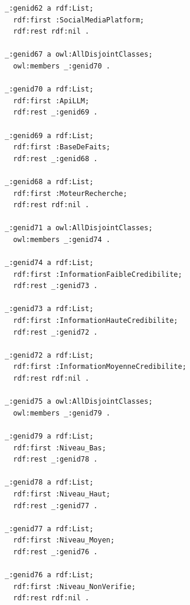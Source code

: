 \documentclass[9pt,twocolumn,twoside,french]{article}
\begin{document}
\begin{lstlisting}[language=Turtle,basicstyle=\ttfamily\tiny,frame=single]
_:genid62 a rdf:List;
  rdf:first :SocialMediaPlatform;
  rdf:rest rdf:nil .

_:genid67 a owl:AllDisjointClasses;
  owl:members _:genid70 .

_:genid70 a rdf:List;
  rdf:first :ApiLLM;
  rdf:rest _:genid69 .

_:genid69 a rdf:List;
  rdf:first :BaseDeFaits;
  rdf:rest _:genid68 .

_:genid68 a rdf:List;
  rdf:first :MoteurRecherche;
  rdf:rest rdf:nil .

_:genid71 a owl:AllDisjointClasses;
  owl:members _:genid74 .

_:genid74 a rdf:List;
  rdf:first :InformationFaibleCredibilite;
  rdf:rest _:genid73 .

_:genid73 a rdf:List;
  rdf:first :InformationHauteCredibilite;
  rdf:rest _:genid72 .

_:genid72 a rdf:List;
  rdf:first :InformationMoyenneCredibilite;
  rdf:rest rdf:nil .

_:genid75 a owl:AllDisjointClasses;
  owl:members _:genid79 .

_:genid79 a rdf:List;
  rdf:first :Niveau_Bas;
  rdf:rest _:genid78 .

_:genid78 a rdf:List;
  rdf:first :Niveau_Haut;
  rdf:rest _:genid77 .

_:genid77 a rdf:List;
  rdf:first :Niveau_Moyen;
  rdf:rest _:genid76 .

_:genid76 a rdf:List;
  rdf:first :Niveau_NonVerifie;
  rdf:rest rdf:nil .

\end{lstlisting}
\end{document}
